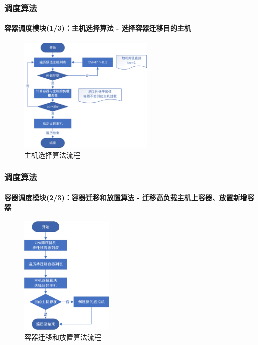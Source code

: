 \begin{frame}
\frametitle{调度算法}
\framesubtitle{容器调度模块(1/3)：主机选择算法 - 选择容器迁移目的主机}
\begin{figure}[htb]
    \centering
    \includegraphics[width=0.58\textwidth]{figures/fig_4_2.jpg}
    \caption{主机选择算法流程}
    \label{fig:fig_4_2}
\end{figure}
\bigskip
\end{frame}

\begin{frame}
\frametitle{调度算法}
\framesubtitle{容器调度模块(2/3)：容器迁移和放置算法 - 迁移高负载主机上容器、放置新增容器}
\begin{figure}[htb]
    \centering
    \includegraphics[width=0.4\textwidth]{figures/fig_4_3.jpg}
    \caption{容器迁移和放置算法流程}
    \label{fig:fig_4_3}
\end{figure}
\end{frame}

